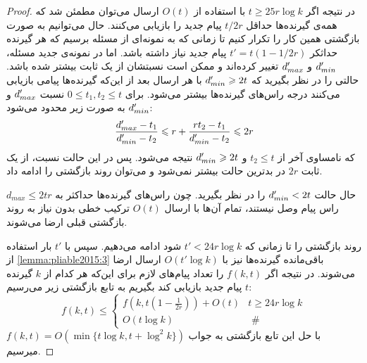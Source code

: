 \begin{proof}
	در نتیجه اگر
	$t \geq 25 r \log k$
	با استفاده از
	$O(t)$
	ارسال می‌توان مطمئن شد که همه‌ی گیرنده‌ها حداقل
	$t/2r$
	پیام جدید را بازیابی می‌کنند. حال می‌توانیم به صورت بازگشتی همین کار را تکرار کنیم تا زمانی که به نمونه‌ای از مسئله برسیم که هر گیرنده حداثکر
	$t' = t(1 - 1/2r)$
	پیام جدید نیاز داشته باشد. اما در نمونه‌ی جدید مسئله،
	$d_{min}'$
	و
	$d_{max}'$
	تغییر کرده‌اند و ممکن است نسبتشان از یک ثابت بیشتر شده باشد. حالتی را در نظر بگیرید که
	$d_{min}' \geqslant 2t$
	با هر ارسال بعد از این‌که گیرنده‌ها پیامی بازیابی می‌کنند درجه راس‌های گیرنده‌ها بیشتر می‌شود. برای
	$0 \leq t_1, t_2 \leq t$
	نسبت
	$d_{max}'$
	و
	$d_{min}'$
	به صورت زیر محدود می‌شود:
	\begin{equation}
		\dfrac{d_{max}' - t_1}{d_{min}' - t_2} \leqslant r + \dfrac{rt_2 - t_1}{d_{min}' - t_2} \leqslant 2r
	\end{equation}
	که نامساوی آخر از 
	$t_2 \leq t$
	و
	$d_{min}' \geqslant 2t$
	نتیجه می‌شود. پس در این حالت نسبت، از یک ثابت
	$2r$
	در بدترین حالت بیشتر نمی‌شود و می‌توان روند بازگشتی را ادامه داد.
	
	حال حالت
	$d_{min}' < 2t$
	را در نظر بگیرید. چون راس‌های گیرنده‌ها حداکثر به
	$d_{max} \leq 2tr$
	راس پیام وصل نیستند، تمام آن‌ها با ارسال
	$O(t)$
	ترکیب خطی بدون نیاز به روند بازگشتی قبلی ارضا می‌شوند.
	
	روند بازگشتی را تا زمانی که
	$t' < 24r \log k$
	شود ادامه می‌دهیم. سپس با 
	$t'$
	بار استفاده از 
	\autoref{lemma:pliable2015:3}
	باقی‌مانده گیرنده‌ها نیز با
	$O(t' \log k)$
	ارسال ارضا می‌شوند. در نتیجه اگر
	$f(k, t)$
	را تعداد پیام‌های لازم برای این‌که هر کدام از
	$k$
	گیرنده
	$t$
	پیام جدید بازیابی کند بگیریم به تابع بازگشتی زیر می‌رسیم:
	\begin{equation}
		f(k, t) \leq \begin{cases}f\left(k, t\left(1-\frac{1}{2 r}\right)\right)+O(t) & t \geq 24 r \log k \\ O(t \log k) & \text { \# }\end{cases}
	\end{equation}
	با حل این تابع بازگشتی به جواب
	$f(k, t) = O(\min\{t \log k, t + \log^2 k\})$
	میرسیم.
\end{proof}

